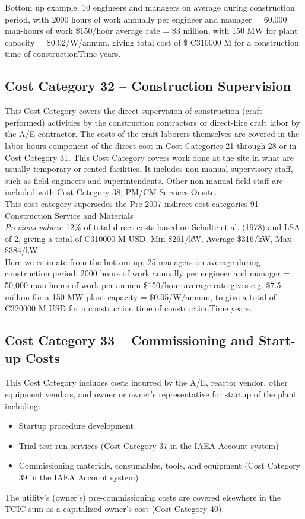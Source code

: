 Bottom up example: 10 engineers and managers on average during construction period, with 2000 hours of work annually per engineer and manager = 60,000 man-hours of work \$150/hour average rate = \$3 million, with 150 MW for plant capacity = \$0.02/W/annum, giving total cost of \$ C310000 M for a construction time of constructionTime years.


\subsection*{Cost Category 32 – Construction Supervision}
This Cost Category covers the direct supervision of construction (craft-performed) activities by the construction contractors or direct-hire craft labor by the A/E contractor. The costs of the craft laborers themselves are covered in the labor-hours component of the direct cost in Cost Categories 21 through 28 or in Cost Category 31. This Cost Category covers work done at the site in what are usually temporary or rented facilities. It includes non-manual supervisory staff, such as field engineers and superintendents. Other non-manual field staff are included with Cost Category 38, PM/CM Services Onsite.\\

This cost category supersedes the Pre 2007 indirect cost categories 91 Construction Service and Materials  \\

\emph{Previous values: } 
12\% of total direct costs based on Schulte et al. (1978) and LSA of 2, giving a total of C310000 M USD. Min \$261/kW, Average \$316/kW, Max \$384/kW. \\

Here we estimate from the bottom up: 25 managers on average during construction period. 2000 hours of work annually per engineer and manager = 50,000 man-hours of work per annum \$150/hour average rate gives e.g. \$7.5 million for a 150 MW plant capacity = \$0.05/W/annum, to give a total of C320000 M USD for a construction time of constructionTime years.

\subsection*{Cost Category 33 – Commissioning and Start-up Costs}
This Cost Category includes costs incurred by the A/E, reactor vendor, other equipment vendors, and owner or owner’s representative for startup of the plant including:
\begin{itemize}
    \item Startup procedure development
    \item Trial test run services (Cost Category 37 in the IAEA Account system)
    \item Commissioning materials, consumables, tools, and equipment (Cost Category 39 in the IAEA Account system)
\end{itemize}
The utility’s (owner’s) pre-commissioning costs are covered elsewhere in the TCIC sum as a capitalized owner’s cost (Cost Category 40).


